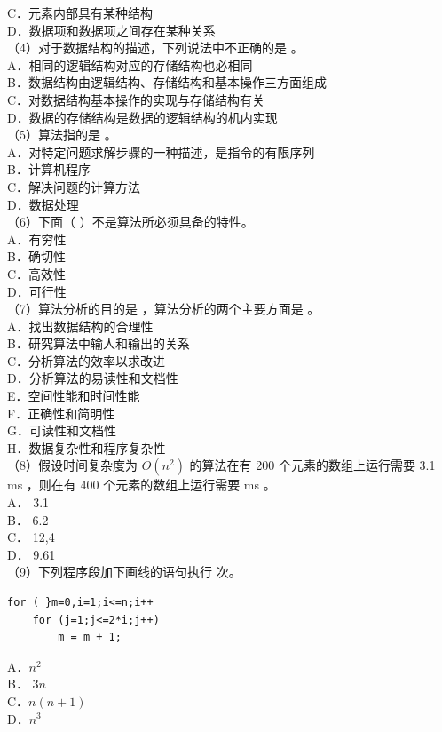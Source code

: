 \documentclass[10pt]{article}
\begin{document}
C．元素内部具有某种结构\\
D．数据项和数据项之间存在某种关系\\
（4）对于数据结构的描述，下列说法中不正确的是 。\\
A．相同的逻辑结构对应的存储结构也必相同\\
B．数据结构由逻辑结构、存储结构和基本操作三方面组成\\
C．对数据结构基本操作的实现与存储结构有关\\
D．数据的存储结构是数据的逻辑结构的机内实现\\
（5）算法指的是 。\\
A．对特定问题求解步骤的一种描述，是指令的有限序列\\
B．计算机程序\\
C．解决问题的计算方法\\
D．数据处理\\
（6）下面（ ）不是算法所必须具备的特性。\\
A．有穷性\\
B．确切性\\
C．高效性\\
D．可行性\\
（7）算法分析的目的是 ，算法分析的两个主要方面是 。\\
A．找出数据结构的合理性\\
B．研究算法中输人和输出的关系\\
C．分析算法的效率以求改进\\
D．分析算法的易读性和文档性\\
E．空间性能和时间性能\\
F．正确性和简明性\\
G．可读性和文档性\\
H．数据复杂性和程序复杂性\\
（8）假设时间复杂度为 $O\left(n^{2}\right)$ 的算法在有 200 个元素的数组上运行需要 3.1 ms ，则在有 400 个元素的数组上运行需要 ms 。\\
A． 3.1\\
B． 6.2\\
C． 12,4\\
D． 9.61\\
（9）下列程序段加下画线的语句执行 次。

\begin{verbatim}
for ( }m=0,i=1;i<=n;i++
    for (j=1;j<=2*i;j++)
        m = m + 1;
\end{verbatim}

A．$n^{2}$\\
B． $3 n$\\
C．$n(n+1)$\\
D．$n^{3}$
\end{document}
